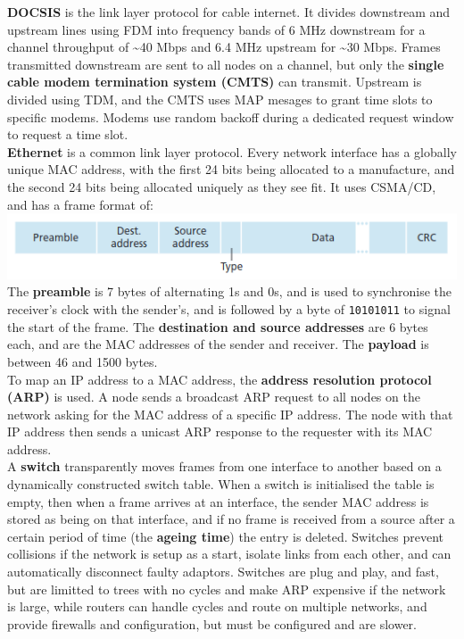 \textbf{DOCSIS} is the link layer protocol for cable internet. It divides downstream and upstream lines using FDM into frequency bands of 6 MHz downstream for a channel throughput of \textasciitilde 40 Mbps and 6.4 MHz upstream for \textasciitilde 30 Mbps. Frames transmitted downstream are sent to all nodes on a channel, but only the \textbf{single cable modem termination system (CMTS)} can transmit. Upstream is divided using TDM, and the CMTS uses MAP mesages to grant time slots to specific modems. Modems use random backoff during a dedicated request window to request a time slot.\\
\textbf{Ethernet} is a common link layer protocol. Every network interface has a globally unique MAC address, with the first 24 bits being allocated to a manufacture, and the second 24 bits being allocated uniquely as they see fit. It uses CSMA/CD, and has a frame format of:
\includegraphics[width=\linewidth]{../images/w11n1ethernetFrame.png}\\
The \textbf{preamble} is 7 bytes of alternating 1s and 0s, and is used to synchronise the receiver's clock with the sender's, and is followed by a byte of \verb|10101011| to signal the start of the frame. The \textbf{destination and source addresses} are 6 bytes each, and are the MAC addresses of the sender and receiver. The \textbf{payload} is between 46 and 1500 bytes.\\
To map an IP address to a MAC address, the \textbf{address resolution protocol (ARP)} is used. A node sends a broadcast ARP request to all nodes on the network asking for the MAC address of a specific IP address. The node with that IP address then sends a unicast ARP response to the requester with its MAC address.\\
A \textbf{switch} transparently moves frames from one interface to another based on a dynamically constructed switch table. When a switch is initialised the table is empty, then when a frame arrives at an interface, the sender MAC address is stored as being on that interface, and if no frame is received from a source after a certain period of time (the \textbf{ageing time}) the entry is deleted. Switches prevent collisions if the network is setup as a start, isolate links from each other, and can automatically disconnect faulty adaptors. Switches are plug and play, and fast, but are limitted to trees with no cycles and make ARP expensive if the network is large, while routers can handle cycles and route on multiple networks, and provide firewalls and configuration, but must be configured and are slower.
